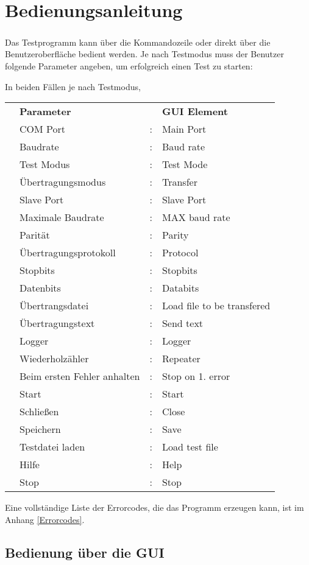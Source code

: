 \chapter{Bedienungsanleitung}\label{chp:bedienungsanleitung}
\paragraph{}
Das Testprogramm kann über die Kommandozeile oder direkt über die Benutzeroberfläche bedient werden. Je nach Testmodus muss der Benutzer folgende Parameter angeben, um erfolgreich einen Test zu starten:


In beiden Fällen  je nach Testmodus, 
\\
\begin{tabular}{llll}
\\ &\textbf{Parameter} & &\textbf{GUI Element}
\\ &COM Port &: &Main Port
\\ &Baudrate &: &Baud rate
\\ &Test Modus &: &Test Mode
\\ &Übertragungsmodus &: &Transfer
\\ &Slave Port &: &Slave Port
\\ &Maximale Baudrate &: &MAX baud rate
\\ &Parität &: &Parity
\\ &Übertragungsprotokoll &: &Protocol
\\ &Stopbits &: &Stopbits
\\ &Datenbits &: &Databits
\\ &Übertrangsdatei &: &Load file to be transfered
\\ &Übertragungstext &: &Send text
\\ &Logger &: &Logger
\\ &Wiederholzähler &: &Repeater
\\ &Beim ersten Fehler anhalten &: &Stop on 1. error
\\ &Start &: &Start
\\ &Schließen &: &Close
\\ &Speichern &: &Save
\\ &Testdatei laden &: &Load test file
\\ &Hilfe &: &Help
\\ &Stop &: &Stop
\end{tabular}

Eine vollständige Liste der Errorcodes, die das Programm erzeugen kann,  ist im Anhang \ref{Errorcodes}.

\section{Bedienung über die GUI}
